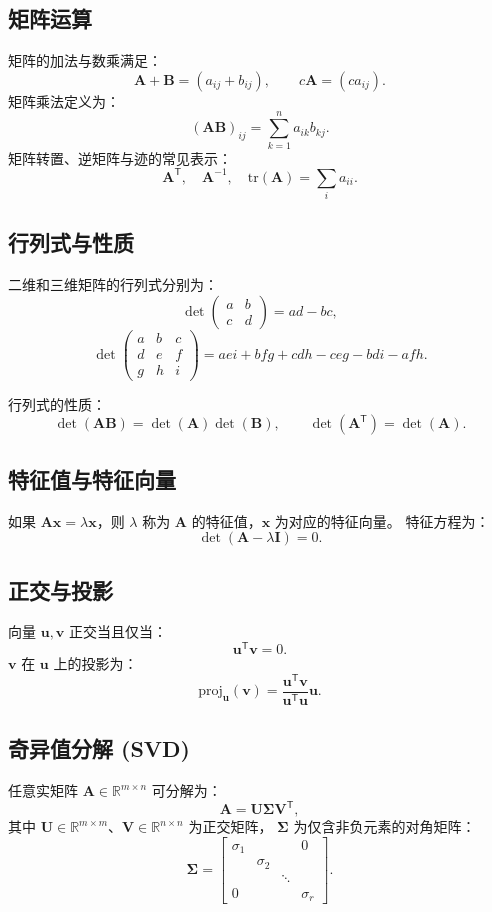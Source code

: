 \documentclass[10pt, a4paper]{article}
\begin{document}
\subsection{矩阵运算}
矩阵的加法与数乘满足：
\[
\mathbf{A} + \mathbf{B} = (a_{ij} + b_{ij}), \qquad
c\mathbf{A} = (c a_{ij}).
\]
矩阵乘法定义为：
\[
(\mathbf{A}\mathbf{B})_{ij} = \sum_{k=1}^{n} a_{ik}b_{kj}.
\]
矩阵转置、逆矩阵与迹的常见表示：
\[
\mathbf{A}^\mathsf{T}, \quad \mathbf{A}^{-1}, \quad \mathrm{tr}(\mathbf{A}) = \sum_{i} a_{ii}.
\]

\subsection{行列式与性质}
二维和三维矩阵的行列式分别为：
\[
\det
\begin{pmatrix}
a & b \\
c & d
\end{pmatrix}
= ad - bc,
\]
\[
\det
\begin{pmatrix}
a & b & c\\
d & e & f\\
g & h & i
\end{pmatrix}
= aei + bfg + cdh - ceg - bdi - afh.
\]

行列式的性质：
\[
\det(\mathbf{A}\mathbf{B}) = \det(\mathbf{A})\det(\mathbf{B}), \qquad
\det(\mathbf{A}^\mathsf{T}) = \det(\mathbf{A}).
\]

\subsection{特征值与特征向量}
如果 $\mathbf{A}\mathbf{x} = \lambda \mathbf{x}$，则 $\lambda$ 称为 $\mathbf{A}$ 的特征值，$\mathbf{x}$ 为对应的特征向量。  
特征方程为：
\[
\det(\mathbf{A} - \lambda \mathbf{I}) = 0.
\]

\subsection{正交与投影}
向量 $\mathbf{u}, \mathbf{v}$ 正交当且仅当：
\[
\mathbf{u}^\mathsf{T} \mathbf{v} = 0.
\]
$\mathbf{v}$ 在 $\mathbf{u}$ 上的投影为：
\[
\mathrm{proj}_{\mathbf{u}}(\mathbf{v}) = 
\frac{\mathbf{u}^\mathsf{T}\mathbf{v}}{\mathbf{u}^\mathsf{T}\mathbf{u}} \mathbf{u}.
\]

\subsection{奇异值分解 (SVD)}
任意实矩阵 $\mathbf{A}\in\mathbb{R}^{m\times n}$ 可分解为：
\[
\mathbf{A} = \mathbf{U}\boldsymbol{\Sigma}\mathbf{V}^\mathsf{T},
\]
其中 $\mathbf{U}\in\mathbb{R}^{m\times m}$、$\mathbf{V}\in\mathbb{R}^{n\times n}$ 为正交矩阵，
$\boldsymbol{\Sigma}$ 为仅含非负元素的对角矩阵：
\[
\boldsymbol{\Sigma} =
\begin{bmatrix}
\sigma_1 &  &  & 0\\
 & \sigma_2 &  & \\
 &  & \ddots & \\
0 &  &  & \sigma_r
\end{bmatrix}.
\]
\end{document}
